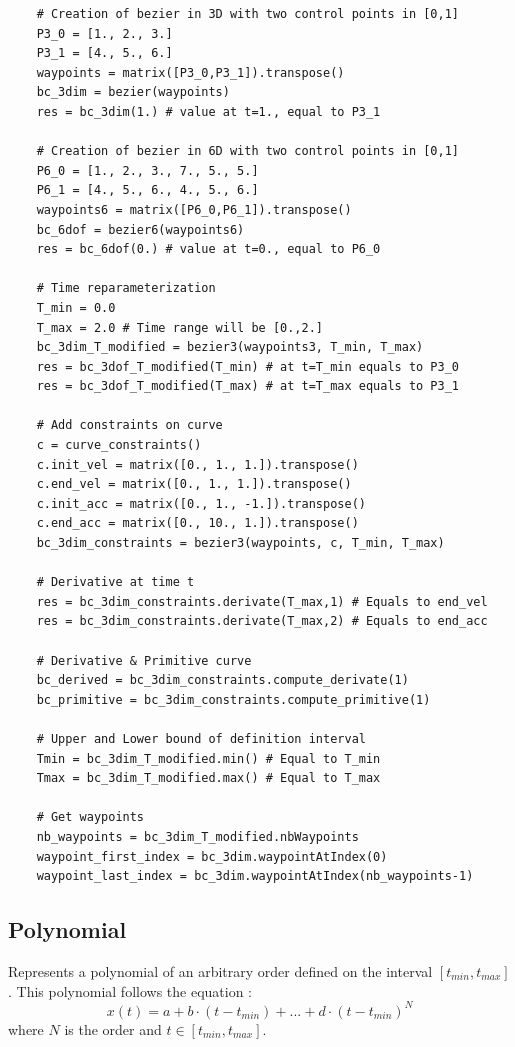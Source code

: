 \documentclass{article}
\begin{document}
    \begin{lstlisting}
    # Creation of bezier in 3D with two control points in [0,1]
    P3_0 = [1., 2., 3.]
    P3_1 = [4., 5., 6.]
    waypoints = matrix([P3_0,P3_1]).transpose()
    bc_3dim = bezier(waypoints)
    res = bc_3dim(1.) # value at t=1., equal to P3_1
    
    # Creation of bezier in 6D with two control points in [0,1]
    P6_0 = [1., 2., 3., 7., 5., 5.]
    P6_1 = [4., 5., 6., 4., 5., 6.]
    waypoints6 = matrix([P6_0,P6_1]).transpose()
    bc_6dof = bezier6(waypoints6)
    res = bc_6dof(0.) # value at t=0., equal to P6_0
    
    # Time reparameterization
    T_min = 0.0
    T_max = 2.0 # Time range will be [0.,2.]
    bc_3dim_T_modified = bezier3(waypoints3, T_min, T_max)
    res = bc_3dof_T_modified(T_min) # at t=T_min equals to P3_0
    res = bc_3dof_T_modified(T_max) # at t=T_max equals to P3_1
    
    # Add constraints on curve
    c = curve_constraints()
    c.init_vel = matrix([0., 1., 1.]).transpose()
    c.end_vel = matrix([0., 1., 1.]).transpose()
    c.init_acc = matrix([0., 1., -1.]).transpose()
    c.end_acc = matrix([0., 10., 1.]).transpose()
    bc_3dim_constraints = bezier3(waypoints, c, T_min, T_max)
    
    # Derivative at time t
    res = bc_3dim_constraints.derivate(T_max,1) # Equals to end_vel
    res = bc_3dim_constraints.derivate(T_max,2) # Equals to end_acc
    
    # Derivative & Primitive curve
    bc_derived = bc_3dim_constraints.compute_derivate(1)
    bc_primitive = bc_3dim_constraints.compute_primitive(1)
    
    # Upper and Lower bound of definition interval
    Tmin = bc_3dim_T_modified.min() # Equal to T_min
    Tmax = bc_3dim_T_modified.max() # Equal to T_max
    
    # Get waypoints
    nb_waypoints = bc_3dim_T_modified.nbWaypoints
    waypoint_first_index = bc_3dim.waypointAtIndex(0)
    waypoint_last_index = bc_3dim.waypointAtIndex(nb_waypoints-1)
    \end{lstlisting}
        
\subsection{Polynomial}
    Represents a polynomial of an arbitrary order defined on the interval $[t_{min}, t_{max}]$. This polynomial follows the equation : 
    \begin{equation}\label{eq:polynomial}
    x(t) = a + b\cdot(t - t_{min}) + ... + d\cdot(t - t_{min})^N
    \end{equation}
    where $N$ is the order and $t \in [t_{min}, t_{max}]$.\\
    
\end{document}
